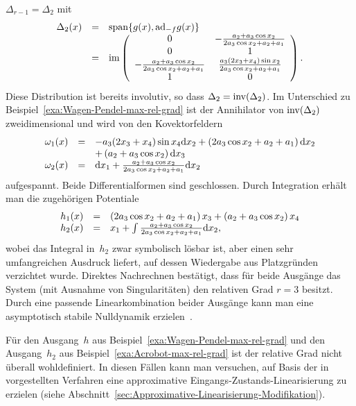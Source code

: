 \begin{example}
$\Delta_{r-1}=\Delta_{2}$ mit 
\[
\begin{array}{lcl}
\Delta_{2}(x) & = & {\operatorname{span}}\{g(x),{\operatorname{ad}}_{-f}g(x)\}\\
 & = & {\operatorname{im}}\left(\begin{array}{cc}
0 & -\frac{a_{2}+a_{3}\cos x_{2}}{2a_{3}\cos x_{2}+a_{2}+a_{1}}\\
0 & 1\\
-\frac{a_{2}+a_{3}\cos x_{2}}{2a_{3}\cos x_{2}+a_{2}+a_{1}} & \frac{a_{3}(2x_{3}+x_{4})\sin x_{2}}{2a_{3}\cos x_{2}+a_{2}+a_{1}}\\
1 & 0
\end{array}\right).
\end{array}
\]
Diese Distribution ist bereits involutiv, so dass $\Delta_{2}={\operatorname{inv}}(\Delta_{2})$.
Im Unterschied zu Beispiel~\ref{exa:Wagen-Pendel-max-rel-grad} ist
der Annihilator von ${\operatorname{inv}}(\Delta_{2})$ zweidimensional und wird von
den Kovektorfeldern 
\[
\begin{array}{lcl}
\omega_{1}(x) & = & -a_{3}(2x_{3}+x_{4})\sin x_{4}{\mathrm{d}} x_{2}+\left(2a_{3}\cos x_{2}+a_{2}+a_{1}\right){\mathrm{d}} x_{2}\\
 &  & +\left(a_{2}+a_{3}\cos x_{2}\right){\mathrm{d}} x_{3}\\
\omega_{2}(x) & = & {\mathrm{d}} x_{1}+\frac{a_{2}+a_{3}\cos x_{2}}{2a_{3}\cos x_{2}+a_{2}+a_{1}}{\mathrm{d}} x_{2}
\end{array}
\]
aufgespannt. Beide Differentialformen sind geschlossen. Durch Integration
erhält man die zugehörigen Potentiale
\[
\begin{array}{lcl}
h_{1}(x) & = & \left(2a_{3}\cos x_{2}+a_{2}+a_{1}\right)x_{3}+\left(a_{2}+a_{3}\cos x_{2}\right)x_{4}\\
h_{2}(x) & = & x_{1}+\int\frac{a_{2}+a_{3}\cos x_{2}}{2a_{3}\cos x_{2}+a_{2}+a_{1}}{\mathrm{d}} x_{2},
\end{array}
\]
wobei das Integral in~$h_{2}$ zwar symbolisch lösbar ist, aber einen
sehr umfangreichen Ausdruck liefert, auf dessen Wiedergabe aus Platzgründen
verzichtet wurde. Direktes Nachrechnen bestätigt, dass für beide Ausgänge
das System (mit Ausnahme von Singularitäten) den relativen Grad $r=3$
besitzt. Durch eine passende Linearkombination beider Ausgänge kann
man eine asymptotisch stabile Nulldynamik erzielen~\cite{zikmund2006,celikovsky2008,maalouf2011ifac}.
\end{example}

Für den Ausgang~$h$ aus Beispiel~\ref{exa:Wagen-Pendel-max-rel-grad}
und den Ausgang~$h_{2}$ aus Beispiel~\ref{exa:Acrobot-max-rel-grad}
ist der relative Grad nicht überall wohldefiniert. In diesen Fällen
kann man versuchen, auf Basis der in~\cite{hauser1990acrobot,hauser92,aguilar2002approximate}
vorgestellten Verfahren eine approximative Eingangs-Zustands-Linearisierung
zu erzielen (siehe Abschnitt~\ref{sec:Approximative-Linearisierung-Modifikation}).


